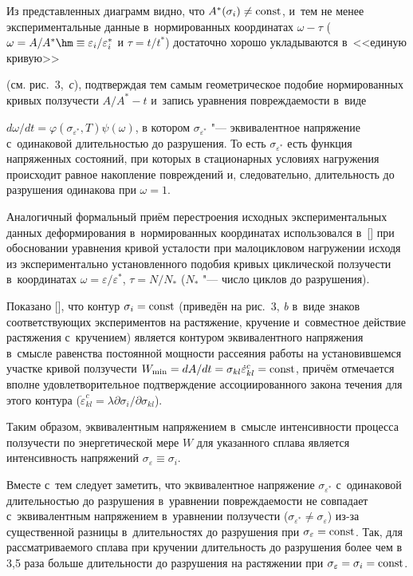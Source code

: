 Из представленных диаграмм видно, что $A^{*}(\sigma_{i})\neq \rm const$, и~тем не менее экспериментальные данные в~нормированных координатах $\omega-\tau$ ( $\omega=A/A^{*}\hm\equiv\varepsilon_{i}/\varepsilon_{i}^{*}$ и $\tau=t/t^{*}$) достаточно хорошо укладываются в~<<единую кривую>>

(см. рис.~3,~{\sl с}), подтверждая тем самым геометрическое подобие нормированных кривых ползучести $A/A^{*}-t$ и~запись уравнения повреждаемости в~виде

$d\omega/dt=\varphi(\sigma_{\varepsilon^{*}},T)\psi(\omega)$, в котором  $\sigma_{\varepsilon^{*}}$ "---  эквивалентное напряжение с~одинаковой длительностью до разрушения. То есть $\sigma_{\varepsilon^{*}}$ есть функция напряженных состояний, при которых в стационарных условиях нагружения происходит равное накопление повреждений и, следовательно, длительность до разрушения одинакова при $\omega=1$. 



Аналогичный формальный приём перестроения исходных экспериментальных данных деформирования в~нормированных координатах использовался в~[] при обосновании уравнения кривой усталости при  малоцикловом нагружении исходя из экспериментально установленного подобия кривых циклической ползучести в~координатах $\omega=\varepsilon/\varepsilon^{*}$, $\tau=N/N_{*}$ ($N_{*}$ "--- число циклов до разрушения).



Показано [], что контур $\sigma_{i}=\rm const$ (приведён на рис.~3, {\sl b} в~виде знаков соответствующих экспериментов на растяжение, кручение и~совместное действие растяжения с~кручением) является контуром эквивалентного напряжения в~смысле равенства постоянной мощности рассеяния работы на установившемся участке кривой ползучести $W_{\min}=dA/dt=\sigma_{kl}\dot{\varepsilon}_{kl}^{c}=\rm const$, причём отмечается вполне удовлетворительное подтверждение ассоциированного закона течения для этого контура ($\dot{\varepsilon}_{kl}^{c}=\lambda \partial\sigma_{i}/\partial\sigma_{kl}$).

Таким образом, эквивалентным напряжением в~смысле интенсивности процесса ползучести по энергетической мере $W$ для указанного сплава является интенсивность напряжений $\sigma_{\varepsilon}\equiv\sigma_{i}$.

Вместе с~тем следует заметить, что эквивалентное напряжение $\sigma_{\varepsilon^{*}}$  с~одинаковой длительностью до разрушения  в~уравнении повреждаемости не совпадает с~эквивалентным напряжением  в~уравнении ползучести \mbox{($\sigma_{\varepsilon^{*}}\neq\sigma_{\varepsilon}$)} из-за существенной разницы в~длительностях до разрушения при $\sigma_{\varepsilon}=\rm const$.  Так, для рассматриваемого сплава при кручении длительность до разрушения более чем в 3,5 раза больше длительности до разрушения на растяжении при $\sigma_{\varepsilon}=\sigma_{i}=\rm const$.





